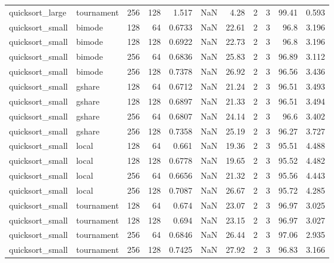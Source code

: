 \begin{tabular}{llrrrrrrrrr}
quicksort_large & tournament & 256 & 128 & 1.517 & NaN & 4.28 & 2 & 3 & 99.41 & 0.593 \\
quicksort_small & bimode & 128 & 64 & 0.6733 & NaN & 22.61 & 2 & 3 & 96.8 & 3.196 \\
quicksort_small & bimode & 128 & 128 & 0.6922 & NaN & 22.73 & 2 & 3 & 96.8 & 3.196 \\
quicksort_small & bimode & 256 & 64 & 0.6836 & NaN & 25.83 & 2 & 3 & 96.89 & 3.112 \\
quicksort_small & bimode & 256 & 128 & 0.7378 & NaN & 26.92 & 2 & 3 & 96.56 & 3.436 \\
quicksort_small & gshare & 128 & 64 & 0.6712 & NaN & 21.24 & 2 & 3 & 96.51 & 3.493 \\
quicksort_small & gshare & 128 & 128 & 0.6897 & NaN & 21.33 & 2 & 3 & 96.51 & 3.494 \\
quicksort_small & gshare & 256 & 64 & 0.6807 & NaN & 24.14 & 2 & 3 & 96.6 & 3.402 \\
quicksort_small & gshare & 256 & 128 & 0.7358 & NaN & 25.19 & 2 & 3 & 96.27 & 3.727 \\
quicksort_small & local & 128 & 64 & 0.661 & NaN & 19.36 & 2 & 3 & 95.51 & 4.488 \\
quicksort_small & local & 128 & 128 & 0.6778 & NaN & 19.65 & 2 & 3 & 95.52 & 4.482 \\
quicksort_small & local & 256 & 64 & 0.6656 & NaN & 21.32 & 2 & 3 & 95.56 & 4.443 \\
quicksort_small & local & 256 & 128 & 0.7087 & NaN & 26.67 & 2 & 3 & 95.72 & 4.285 \\
quicksort_small & tournament & 128 & 64 & 0.674 & NaN & 23.07 & 2 & 3 & 96.97 & 3.025 \\
quicksort_small & tournament & 128 & 128 & 0.694 & NaN & 23.15 & 2 & 3 & 96.97 & 3.027 \\
quicksort_small & tournament & 256 & 64 & 0.6846 & NaN & 26.44 & 2 & 3 & 97.06 & 2.935 \\
quicksort_small & tournament & 256 & 128 & 0.7425 & NaN & 27.92 & 2 & 3 & 96.83 & 3.166 \\
\bottomrule
\end{tabular}

